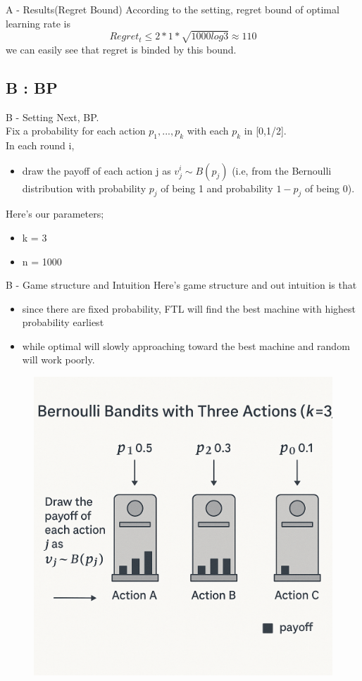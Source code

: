 \documentclass{beamer}
\begin{document}
\begin{frame}{A - Results(Regret Bound)}
    According to the setting, regret bound of optimal learning rate is
    \[
    Regret_t \leq 2 * 1 * \sqrt{1000log3} \approx 110
    \]
    we can easily see that regret is binded by this bound.
\end{frame}

\subsection{B : BP}

\begin{frame}{B - Setting}
    Next, BP.\\
    Fix a probability for each action $p_{1},...,p_{k}$ with each $p_{k}$ in [0,1/2].\\
    In each round i,
    \begin{itemize}
        \item draw the payoff of each action j as $v^{i}_{j} \sim B(p_{j})$ (i.e, from the Bernoulli distribution with probability $p_j$ of being 1 and probability $1-p_{j}$ of being 0).
    \end{itemize}
    \vspace{1em}
    Here's our parameters;
    \begin{itemize}
        \item k = 3
        \item n = 1000
    \end{itemize}
\end{frame}

\begin{frame}{B - Game structure and Intuition}
    Here's game structure and out intuition is that 
    \begin{itemize}
        \item since there are fixed probability, FTL will find the best machine with highest probability earliest
        \item while optimal will slowly approaching toward the best machine and random will work poorly.
    \end{itemize}
    \begin{figure}
        \centering
        \includegraphics[width=0.4\linewidth]{../figures/Image_B.png}
        \label{fig:placeholder}
    \end{figure}
\end{frame}
\end{document}
